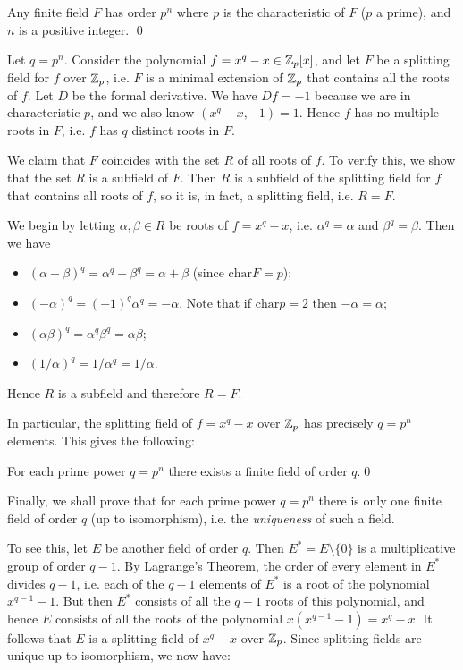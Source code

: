 \begin{fact}
	Any finite field $F$ has order $p^n$ where $p$ is the characteristic of $F$ ($p$ a prime), and $n$ is a positive integer. \qed
\end{fact}

Let $q = p^n$. Consider the polynomial $f = x^q - x \in \mathbb{Z}_p[x]$, and let $F$ be a splitting field for $f$ over $\mathbb{Z}_p$, i.e. $F$ is a minimal extension of $\mathbb{Z}_p$ that contains all the roots of $f$. Let $D$ be the formal derivative. We have $Df = -1$ because we are in characteristic $p$, and we also know $(x^q - x, -1) = 1$. Hence $f$ has no multiple roots in $F$, i.e. $f$ has $q$ distinct roots in $F$.

We claim that $F$ coincides with the set $R$ of all roots of $f$. To verify this, we show that the set $R$ is a subfield of $F$. Then $R$ is a subfield of the splitting field for $f$ that contains all roots of $f$, so it is, in fact, a splitting field, i.e. $R = F$.

We begin by letting $\alpha, \beta \in R$ be roots of $f = x^q - x$, i.e. $\alpha^q = \alpha$ and $\beta^q = \beta$. Then we have
\begin{itemize}
	\item $(\alpha + \beta)^q = \alpha^q + \beta^q = \alpha + \beta$ (since $\text{char}{F} = p$);
	\item $(-\alpha)^q = (-1)^q \alpha^q = -\alpha$. Note that if $\text{char}{p} = 2$ then $-\alpha = \alpha$;
	\item $(\alpha\beta)^q = \alpha^q \beta^q = \alpha\beta$;
	\item $(1 / \alpha)^q = 1 / \alpha^q = 1 / \alpha$.
\end{itemize}
Hence $R$ is a subfield and therefore $R = F$.

In particular, the splitting field of $f = x^q - x$ over $\mathbb{Z}_p$ has precisely $q = p^n$ elements. This gives the following:

\begin{fact}
	For each prime power $q = p^n$ there exists a finite field of order $q$.\qed
\end{fact}

Finally, we shall prove that for each prime power $q = p^n$ there is only one finite field of order $q$ (up to isomorphism), i.e. the \emph{uniqueness} of such a field.

To see this, let $E$ be another field of order $q$. Then $E^* = E \setminus \{0\}$ is a multiplicative group of order $q - 1$. By Lagrange's Theorem, the order of every element in $E^*$ divides $q - 1$, i.e. each of the $q - 1$ elements of $E^*$ is a root of the polynomial $x^{q - 1} - 1$. But then $E^*$ consists of all the $q - 1$ roots of this polynomial, and hence $E$ consists of all the roots of the polynomial $x(x^{q - 1} - 1) = x^q - x$. It follows that $E$ is a splitting field of $x^q - x$ over $\mathbb{Z}_p$. Since splitting fields are unique up to isomorphism, we now have:

